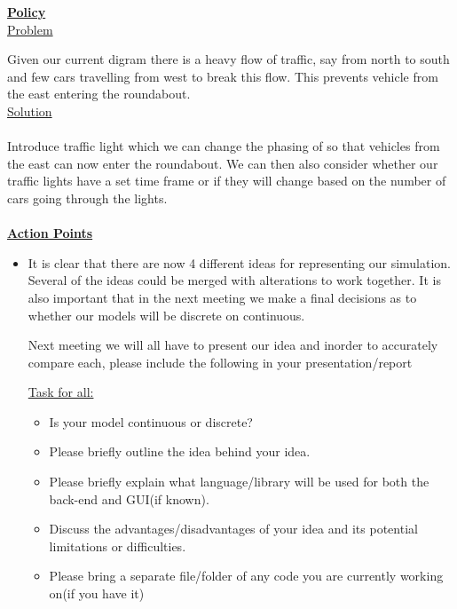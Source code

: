 \documentclass{article}
\begin{document}
	
		{\underline{\bf{Policy}}}\\
		
		\underline{Problem}\\\vspace{0.05cm}
	
		\noindent Given our current digram there is a heavy flow of traffic, say from north to south and  few cars travelling from west to break this flow. This prevents vehicle from the east entering the roundabout. \\
		
		\underline{Solution}\\\\
		Introduce traffic light which we can change the phasing of so that vehicles from the east can now enter the roundabout. We can then also consider whether our traffic lights have a set time frame or if they will change based on the number of cars going through the lights. \\\\
	
	
	{\underline{\bf{Action Points}\\}}
	\begin{itemize}
		\item It is clear that there are now 4 different ideas for representing our simulation. Several of the ideas could be merged with alterations to work together. 
		It is also important that in the next meeting we make a final decisions as to whether our models will be discrete on continuous. 
		
		Next meeting we will all have to present our idea and inorder to accurately compare each, please include the following in your presentation/report
		
		
		{\underline{Task for all: }}
		\begin{itemize}
			\item Is your model continuous or discrete?
			\item Please briefly outline the idea behind your idea. 
			\item Please briefly explain what language/library will be used for both the back-end and GUI(if known). 
			\item Discuss the advantages/disadvantages of your idea and its potential limitations or difficulties. 
			\item Please bring a separate file/folder of any code you are currently working on(if you have it) 
		\end{itemize}
		
	\end{itemize}
	
	
	
	
\end{document}
